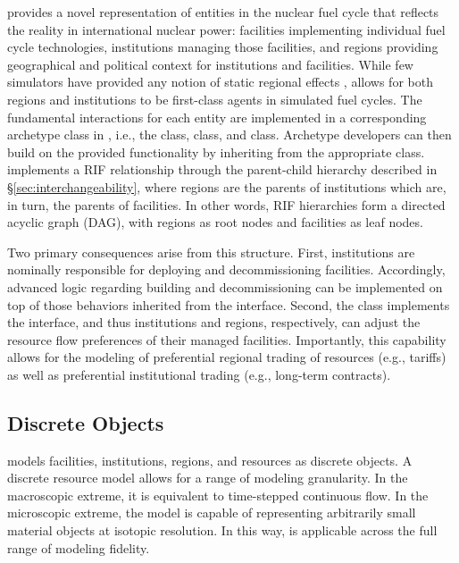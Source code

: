 \Cyclus provides a novel representation of entities in the nuclear fuel cycle
that reflects the reality in international nuclear power: facilities implementing individual fuel cycle technologies, institutions managing those facilities, and regions providing geographical and political context for institutions and facilities. While
few simulators have provided any notion of static regional
effects \cite{huff_next_2010,juchau_modeling_2010}, \Cyclus allows for both regions and institutions to be first-class
agents in simulated fuel cycles. The fundamental interactions for each entity are implemented in a corresponding
archetype class in \Cyclus, i.e., the  class, 
class, and  class. Archetype developers can then build on the
provided functionality by inheriting from the appropriate class.
\Cyclus implements a \gls{RIF} relationship through the
parent-child hierarchy described in \S \ref{sec:interchangeability}, where
regions are the parents of institutions which are, in turn, the parents of
facilities. In other words, \gls{RIF} hierarchies form a directed acyclic graph (DAG),
with regions as root nodes and facilities as leaf nodes.

Two primary consequences arise from this structure. First, institutions are
nominally responsible for deploying and decommissioning facilities. Accordingly, advanced
logic regarding building and decommissioning can be implemented on top of
those behaviors inherited from the
 interface. Second, the  class implements the
 interface, and thus institutions and regions, respectively, can
adjust the resource flow preferences of their managed facilities. Importantly,
this capability allows for the modeling of preferential regional trading
of resources (e.g., tariffs) as well as preferential institutional trading
(e.g., long-term contracts).

\subsection{Discrete Objects}

\Cyclus models facilities, institutions, regions, and resources as discrete
objects. A discrete resource model allows for a range of modeling granularity. In the
macroscopic extreme, it is equivalent to time-stepped continuous flow. In the
microscopic extreme, the model is capable of representing arbitrarily small
material objects at isotopic resolution. In this way, \Cyclus is
applicable across the full range of modeling fidelity.

